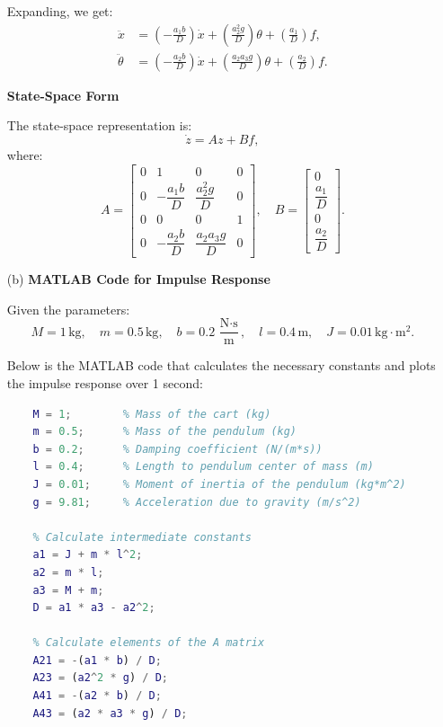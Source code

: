 \documentclass{article}
\begin{document}
\begin{enumerate}
    Expanding, we get:
    \begin{align*}
    \ddot{x} &= \left( -\frac{a_1 b}{D} \right) \dot{x} + \left( \frac{a_2^2 g}{D} \right) \theta + \left( \frac{a_1}{D} \right) f, \\
    \ddot{\theta} &= \left( -\frac{a_2 b}{D} \right) \dot{x} + \left( \frac{a_2 a_3 g}{D} \right) \theta + \left( \frac{a_2}{D} \right) f.
    \end{align*}

    \textbf{State-Space Form}

    The state-space representation is:
    \[
    \dot{z} = A z + B f,
    \]
    where:
    \[
    A =
    \begin{bmatrix}
    0 & 1 & 0 & 0 \\
    0 & -\dfrac{a_1 b}{D} & \dfrac{a_2^2 g}{D} & 0 \\
    0 & 0 & 0 & 1 \\
    0 & -\dfrac{a_2 b}{D} & \dfrac{a_2 a_3 g}{D} & 0
    \end{bmatrix}, \quad
    B =
    \begin{bmatrix}
    0 \\
    \dfrac{a_1}{D} \\
    0 \\
    \dfrac{a_2}{D}
    \end{bmatrix}.
    \]

    \item[(b)] \textbf{MATLAB Code for Impulse Response}

    Given the parameters:
    \[
    M = 1\, \text{kg}, \quad m = 0.5\, \text{kg}, \quad b = 0.2\, \frac{\text{N}\cdot\text{s}}{\text{m}}, \quad l = 0.4\, \text{m}, \quad J = 0.01\, \text{kg}\cdot\text{m}^2.
    \]

    Below is the MATLAB code that calculates the necessary constants and plots the impulse response over 1 second:

    \begin{lstlisting}[language=Matlab]
    % Define the given parameters
    M = 1;        % Mass of the cart (kg)
    m = 0.5;      % Mass of the pendulum (kg)
    b = 0.2;      % Damping coefficient (N/(m*s))
    l = 0.4;      % Length to pendulum center of mass (m)
    J = 0.01;     % Moment of inertia of the pendulum (kg*m^2)
    g = 9.81;     % Acceleration due to gravity (m/s^2)

    % Calculate intermediate constants
    a1 = J + m * l^2;
    a2 = m * l;
    a3 = M + m;
    D = a1 * a3 - a2^2;

    % Calculate elements of the A matrix
    A21 = -(a1 * b) / D;
    A23 = (a2^2 * g) / D;
    A41 = -(a2 * b) / D;
    A43 = (a2 * a3 * g) / D;


\end{lstlisting}
\end{enumerate}
\end{document}
